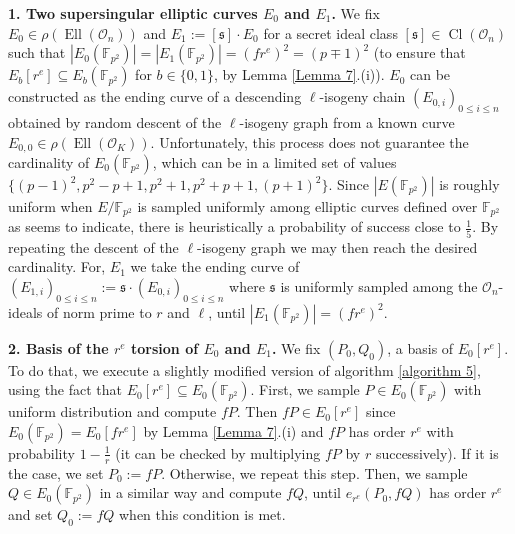 \documentclass[a4paper,10pt]{report}
\theoremstyle{definition}
\theoremstyle{plain}
\theoremstyle{definition}
\newcommand{\F}{\mathbb{F}}
\newcommand{\mO}{\mathcal{O}}
\renewcommand{\(}{\left(}
\renewcommand{\)}{\right)}
\newcommand{\mf}[1]{\mathfrak{#1}}
\DeclareMathOperator{\Cl}{Cl}
\DeclareMathOperator{\Ell}{Ell}
\begin{document}
\textbf{1. Two supersingular elliptic curves $E_0$ and $E_1$.}
We fix $E_0\in\rho(\Ell(\mO_n))$ and $E_1:=[\mf{s}]\cdot E_0$ for a secret ideal class $[\mf{s}]\in\Cl(\mO_n)$ such that $|E_0(\F_{p^2})|=|E_1(\F_{p^2})|=(f r^e)^2=(p\mp 1)^2$ (to ensure that $E_b[r^e]\subseteq E_b(\F_{p^2})$ for $b\in\{0,1\}$, by Lemma \ref{Lemma 7}.(i)). $E_0$ can be constructed as the ending curve of a descending $\ell$-isogeny chain $(E_{0,i})_{0\leq i\leq n}$ obtained by random descent of the $\ell$-isogeny graph from a known curve $E_{0,0}\in\rho(\Ell(\mO_K))$.  Unfortunately, this process does not guarantee the cardinality of $E_0(\F_{p^2})$, which can be in a limited set of values $\{(p-1)^2,p^2-p+1,p^2+1,p^2+p+1,(p+1)^2\}$. Since $|E(\F_{p^2})|$ is roughly uniform when $E/\F_{p^2}$ is sampled uniformly among elliptic curves defined over $\F_{p^2}$ as \cite[Theorem 1.1]{Howe} seems to indicate, there is heuristically a probability of success close to $\frac{1}{5}$. By repeating the descent of the $\ell$-isogeny graph we may then reach the desired cardinality.  For, $E_1$ we take the ending curve of $(E_{1,i})_{0\leq i\leq n}:=\mf{s}\cdot (E_{0,i})_{0\leq i\leq n}$ where $\mf{s}$ is uniformly sampled among the $\mO_n$-ideals of norm prime to $r$ and $\ell$, until $|E_1(\F_{p^2})|=(f r^e)^2$. 

\textbf{2. Basis of the $r^e$ torsion of $E_0$ and $E_1$.}
We fix $(P_0, Q_0)$, a basis of $E_0[r^e]$. To do that, we execute a slightly modified version of algorithm \ref{algorithm 5}, using the fact that $E_0[r^e]\subseteq E_0(\F_{p^2})$. First, we sample $P\in E_0(\F_{p^2})$ with uniform distribution and compute $fP$. Then $fP\in E_0[r^e]$ since $E_0(\F_{p^2})=E_0[fr^e]$ by Lemma \ref{Lemma 7}.(i) and $fP$ has order $r^e$ with probability $1-\frac{1}{r}$ (it can be checked by multiplying $fP$ by $r$ successively). If it is the case, we set $P_0:=fP$. Otherwise, we repeat this step. Then, we sample $Q\in E_0(\F_{p^2})$ in a similar way and compute $fQ$, until $e_{r^e}(P_0,fQ)$ has order $r^e$ and set $Q_0:=fQ$ when this condition is met.  
\end{document}
